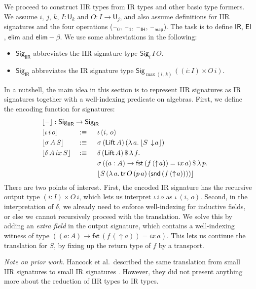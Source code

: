 \documentclass[acmsmall,screen,review,anonymous]{acmart}
\newcommand{\msf}[1]{{\mathsf{#1}}}
\newcommand{\U}{\msf{U}}
\newcommand{\El}{\msf{El}}
\newcommand{\Lift}{\msf{Lift}}
\newcommand{\lup}{\uparrow}
\newcommand{\ldown}{\downarrow}
\newcommand{\Sig}{\msf{Sig}}
\newcommand{\blank}{{\mathord{\hspace{1pt}\text{--}\hspace{1pt}}}}
\newcommand{\ix}{{ix}}
\newcommand{\IR}{\msf{IR}}
\newcommand{\IH}{\msf{IH}}
\newcommand{\map}{\msf{map}}
\newcommand{\elim}{\msf{elim}}
\newcommand{\tr}{\msf{tr}}
\newcommand{\fst}{\msf{fst}}
\newcommand{\snd}{\msf{snd}}
\newcommand{\IIR}{\msf{IIR}}
\newcommand{\Sigr}[1]{\lfloor #1 \rfloor}
\begin{document}
We proceed to construct IIR types from IR types and other basic type formers. We assume $i$, $j$,
$k$, $I : \U_k$ and $O : I \to \U_j$, and also assume definitions for IIR signatures and the four
operations ($\blank_0$, $\blank_1$, $\blank_\IH$, $\blank_\map$). The task is to define $\IR$,
$\El$, $\elim$ and $\elim\!-\!\!\beta$. We use some abbreviations in the following:
\begin{itemize}
\item $\Sig_\IIR$ abbreviates the IIR signature type $\Sig_i\,I\,O$.
\item $\Sig_\IR$ abbreviates the IR signature type $\Sig_{\max(i,\,k)}\,((i : I) \times O\,i)$.
\end{itemize}
In a nutshell, the main idea in this section is to represent IIR signatures as IR signatures
together with a well-indexing predicate on algebras. First, we define the encoding function for
signatures:
\begin{alignat*}{4}
  & \rlap{$\Sigr{\blank} : \Sig_\IIR \to \Sig_\IR$}\\
  & \Sigr{\iota\,i\,o}       &&:\equiv \hspace{0.5em} &&\iota\,(i,\,o)\\
  & \Sigr{\sigma\,A\,S}      &&:\equiv \hspace{0.5em} &&\sigma\,(\Lift\,A)\,(\lambda\,a.\,\Sigr{S\,\ldown\!a})\\
  & \Sigr{\delta\,A\,\ix\,S} &&:\equiv \hspace{0.5em} &&\delta\,(\Lift\,A)\,\$\,\lambda\,f.\\
  &  &&                                &&\sigma\,((a : A) \to \fst\,(f\,(\lup\!a)) = \ix\,a)\,\$\,\lambda\,p.\\
  &  &&                                &&\Sigr{S\,(\lambda\,a.\,\tr\,O\,(p\,a)\,(\snd\,(f\,(\lup\! a))))}
\end{alignat*}
There are two points of interest. First, the encoded IR signature has the recursive output type $(i
: I) \times O\,i$, which lets us interpret $\iota\,i\,o$ as $\iota\,(i,\,o)$. Second, in the
interpretation of $\delta$, we already need to enforce well-indexing for inductive fields, or else
we cannot recursively proceed with the translation. We solve this by adding an \emph{extra field} in
the output signature, which contains a well-indexing witness of type $((a : A) \to \fst\,(f\,(\lup\!a)) = \ix\,a)$.
This lets us continue the translation for $S$, by fixing up the return type of $f$ by a transport.

\emph{Note on prior work.} Hancock et al.\ described the same translation from small IIR
signatures to small IR signatures \cite{TODO}. However, they did not present anything more about the
reduction of IIR types to IR types.
\end{document}
